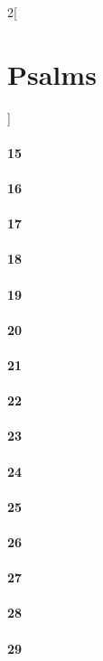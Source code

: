 \documentclass{book}
\begin{document}
\begin{multicols}{2}[\part{Psalms}]
\subsection*{15}
\subsection*{16}
\subsection*{17}
\subsection*{18}
\subsection*{19}
\subsection*{20}
\subsection*{21}
\subsection*{22}
\subsection*{23}
\subsection*{24}
\subsection*{25}
\subsection*{26}
\subsection*{27}
\subsection*{28}
\subsection*{29}

\end{multicols}
\end{document}
